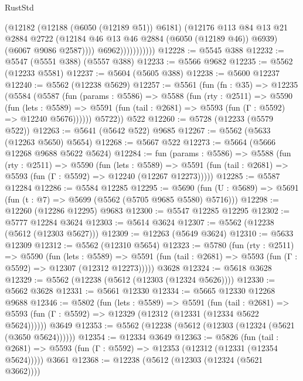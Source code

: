 \begin{lexlean}{RustStd}
\begin{coremodule}
                            (@12182
                              (@12188 (@6050 (@12189 @51)) @6181)
                              (@12176
                                @113
                                @84
                                @13
                                @21
                                @2884
                                @2722
                                (@12184 @46 @13 @46 @2884 (@6050 (@12189 @46)) @6939)
                                (@6067 @9086 @2587))))
                          @6962)))))))))))
@12228 := @5545 @388
@12232 := @5547 (@5551 @388) (@5557 @388)
@12233 := @5566 @9682
@12235 := @5562 (@12233 @5581)
@12237 := @5604 (@5605 @388)
@12238 := @5600 @12237
@12240 := @5562 (@12238 @5629)
@12257 := @5561
    (fun (fn : @35) =>
    @12235
      (@5584
        (@5587
          (fun (params : @5586) =>
          @5588
            (fun (rty : @2511) =>
            @5590
              (fun (lets : @5589) =>
              @5591 (fun (tail : @2681) => @5593 (fun (Γ : @5592) => @12240 @5676))))))
        @5722))
    @522
@12260 := @5728 (@12233 (@5579 @522))
@12263 := @5641 (@5642 @522) @9685
@12267 := @5562 (@5633 (@12263 @5650) @5654)
@12268 := @5667 @522
@12273 := @5664 (@5666 @12268 @9688 @5622 @5624)
@12284 := fun (params : @5586) =>
  @5588
    (fun (rty : @2511) =>
    @5590
      (fun (lets : @5589) =>
      @5591 (fun (tail : @2681) => @5593 (fun (Γ : @5592) => @12240 (@12267 @12273)))))
@12285 := @5587 @12284
@12286 := @5584 @12285
@12295 := @5690 (fun (U : @5689) => @5691 (fun (t : @7) => @5699 (@5562 (@5705 @9685 @5580) @5716)))
@12298 := @12260 (@12286 @12295) @9683
@12300 := @5547 @12285 @12295
@12302 := @5777 @12284 @3624
@12303 := @5614 @3624
@12307 := @5562 (@12238 (@5612 (@12303 @5627)))
@12309 := @12263 (@5649 @3624)
@12310 := @5633 @12309
@12312 := @5562 (@12310 @5654)
@12323 := @5780
    (fun (rty : @2511) =>
    @5590
      (fun (lets : @5589) =>
      @5591 (fun (tail : @2681) => @5593 (fun (Γ : @5592) => @12307 (@12312 @12273)))))
    @3628
@12324 := @5618 @3628
@12329 := @5562 (@12238 (@5612 (@12303 (@12324 @5626))))
@12330 := @5662 @3628
@12331 := @5661 @12330
@12334 := @5665 @12330 @12268 @9688
@12346 := @5802
    (fun (lets : @5589) =>
    @5591
      (fun (tail : @2681) =>
      @5593 (fun (Γ : @5592) => @12329 (@12312 (@12331 (@12334 @5622 @5624))))))
    @3649
@12353 := @5562 (@12238 (@5612 (@12303 (@12324 (@5621 (@3650 @5624))))))
@12354 := @12334 @3649
@12363 := @5826
    (fun (tail : @2681) => @5593 (fun (Γ : @5592) => @12353 (@12312 (@12331 (@12354 @5624)))))
    @3661
@12368 := @12238 (@5612 (@12303 (@12324 (@5621 @3662))))

\end{coremodule}
\end{lexlean}
